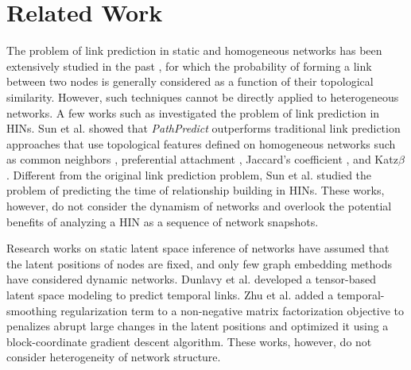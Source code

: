 \section{Related Work}


The problem of link prediction in static and homogeneous networks has been extensively studied in the past
\cite{liben2007link,wang2007local,lichtenwalter2010new,leroy2010cold,al2006link,al2011survey}, for which the probability of forming a link between two nodes is generally considered as a function of their topological similarity. However, such techniques cannot be directly applied to heterogeneous networks. A few works such as \cite{sun2011ASONAM,Sun:2012:HRP:2124295.2124373} investigated the problem of link prediction in HINs. Sun et al. \cite{sun2011ASONAM} showed that \textit{PathPredict} outperforms traditional link prediction approaches that use topological features defined on homogeneous networks such as common neighbors \cite{newman2001clustering}, preferential attachment \cite{newman2001clustering}, Jaccard's coefficient \cite{liben2007link}, and Katz$\beta$ \cite{katz1953new}. Different from the original link prediction problem, Sun et al. \cite{Sun:2012:HRP:2124295.2124373} studied the problem of predicting the time of relationship building in HINs. These works, however, do not consider the dynamism of networks and overlook the potential benefits of analyzing a HIN as a sequence of network snapshots.


Research works on static latent space inference of networks \cite{sarkar2005dynamic,menon2011link,yin2013scalable,qi2013link,ye2013predicting} have assumed that the latent positions of nodes are fixed, and only few graph embedding methods \cite{fu2009dynamic,dunlavy2011temporal,Zhu2016} have considered dynamic networks. Dunlavy et al. \cite{dunlavy2011temporal} developed a tensor-based latent space modeling to predict temporal links. Zhu et al. \cite{Zhu2016} added a temporal-smoothing regularization term to a non-negative matrix factorization objective to penalizes abrupt large changes in the latent positions and optimized it using a block-coordinate gradient descent algorithm. These works, however, do not consider heterogeneity of network structure.

